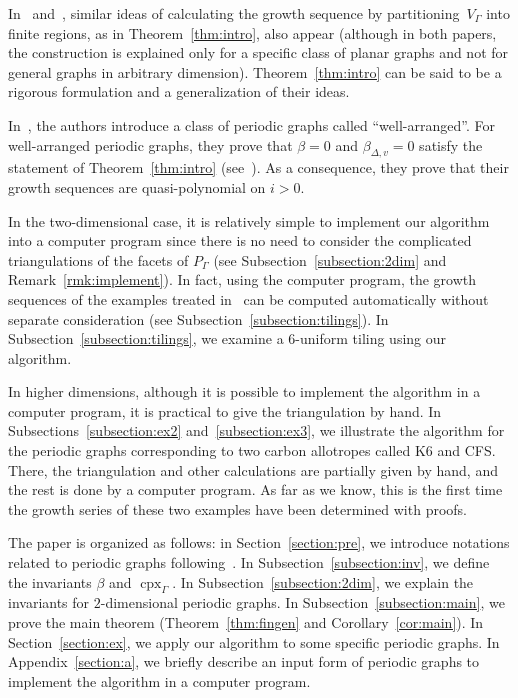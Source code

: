 \documentclass[11pt]{article}
\theoremstyle{definition}
\numberwithin{equation}{section}
\begin{document}
In~\cite{SM20a} and~\cite{GS19}, 
similar ideas of calculating the growth sequence by partitioning~$V_{\Gamma}$ into finite regions, as in Theorem~\ref{thm:intro}, also appear (although in both papers, the construction is explained only for a specific class of planar graphs and not for general graphs in arbitrary dimension). 
Theorem~\ref{thm:intro} can be said to be a rigorous formulation and a generalization of their ideas. 

In~\cite{IN}, the authors introduce a class of periodic graphs called ``well-arranged''. 
For well-arranged periodic graphs, they prove that $\beta = 0$ and $\beta _{\Delta, v} = 0$ satisfy the statement of Theorem~\ref{thm:intro} (see~\cite[Claim 4.10]{IN}). As a consequence, they prove that their growth sequences are quasi-polynomial on $i  > 0$. 

In the two-dimensional case, 
it is relatively simple to implement our algorithm into a computer program 
since there is no need to consider the complicated triangulations of the facets of $P_{\Gamma}$ (see Subsection~\ref{subsection:2dim} and Remark~\ref{rmk:implement}). 
In fact, using the computer program, the growth sequences of the examples treated in~\cite{GS19} can be computed automatically without separate consideration (see Subsection~\ref{subsection:tilings}). 
In Subsection~\ref{subsection:tilings}, we examine a $6$-uniform tiling using our algorithm. 

In higher dimensions, although it is possible to implement the algorithm in a computer program, 
it is practical to give the triangulation by hand. 
In Subsections~\ref{subsection:ex2} and~\ref{subsection:ex3}, we illustrate the algorithm for the periodic graphs corresponding to two carbon allotropes called K6 and {\sf CFS}. 
There, the triangulation and other calculations are partially given by hand, and the rest is done by a computer program. 
As far as we know, this is the first time the growth series of these two examples have been determined with proofs.

The paper is organized as follows: 
in Section~\ref{section:pre}, we introduce notations related to periodic graphs following~\cite{IN}. 
In Subsection~\ref{subsection:inv}, we define the invariants $\beta$ and $\operatorname{cpx}_{\Gamma}$. 
In Subsection~\ref{subsection:2dim}, we explain the invariants for $2$-dimensional periodic graphs. 
In Subsection~\ref{subsection:main}, we prove the main theorem (Theorem~\ref{thm:fingen} and Corollary~\ref{cor:main}). 
In Section~\ref{section:ex}, we apply our algorithm to some specific periodic graphs. 
In Appendix~\ref{section:a}, we briefly describe an input form of periodic graphs to implement the algorithm in a computer program. 
\end{document}
